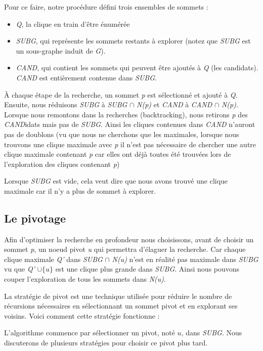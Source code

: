 \documentclass[12pt,a4paper]{article}
\begin{document}
Pour ce faire, notre procédure défini trois ensembles de sommets :
\begin{itemize}
  \item \emph{Q}, la clique en train d'être énumérée
  \item \emph{SUBG}, qui représente les sommets restants à explorer (notez que \emph{SUBG} est un sous-graphe induit de \emph{G}).
  \item \emph{CAND}, qui contient les sommets qui peuvent être ajoutés à \emph{Q} (les candidats). \emph{CAND} est entièrement contenue dans \emph{SUBG}.
\end{itemize}
À chaque étape de la recherche, un sommet \emph{p} est sélectionné et ajouté à \emph{Q}.  Ensuite, nous réduisons \emph{SUBG} à \emph{SUBG} \(\cap\) \emph{N(p)} et \emph{CAND} à \emph{CAND} \(\cap\) \emph{N(p)}. Lorsque nous remontons dans la recherches (backtracking), nous retirons \emph{p} des \emph{CAND}idats mais pas de \emph{SUBG}. Ainsi les cliques contenues dans \emph{CAND} n'auront pas de doublons (vu que nous ne cherchons que les maximales, lorsque nous trouvons une clique maximale avec \emph{p} il n'est pas nécessaire de chercher une autre clique maximale contenant \emph{p} car elles ont déjà toutes été trouvées lors de l'exploration des cliques contenant \emph{p})

Lorsque \emph{SUBG} est vide, cela veut dire que nous avons trouvé une clique maximale car il n'y a plus de sommet à explorer.

\subsection{Le pivotage}%
\label{subsec:pivotage}


Afin d'optimiser la recherche en profondeur nous choisissons, avant de choisir un sommet \emph{p}, un noeud pivot \emph{u} qui permettra d'élaguer la recherche. Car chaque clique maximale \emph{Q'} dans \emph{SUBG} \(\cap\) \emph{N(u)} n'est en réalité pas maximale dans \emph{SUBG} vu que \emph{Q'} \(\cup \{u\}\) est une clique plus grande dans \emph{SUBG}. Ainsi nous pouvons couper l'exploration de tous les sommets dans \emph{N(u)}.


La stratégie de pivot est une technique utilisée pour réduire le nombre de récursions nécessaires en sélectionnant un sommet pivot et en explorant ses voisins. Voici comment cette stratégie fonctionne :

L'algorithme commence par sélectionner un pivot, noté \( u \), dans \emph{SUBG}. Nous discuterons de plusieurs stratégies pour choisir ce pivot plus tard.
\end{document}
